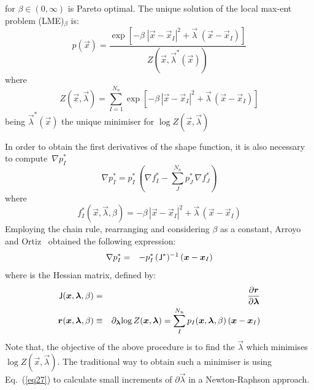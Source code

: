 for $\beta \in (0,\infty)$ is Pareto optimal. The unique solution of
the local max-ent problem (LME)$_\beta$ is: 
\begin{equation}
  \label{eq:LME-p}
p(\vec{x})=\frac{\exp\left[ -\beta \; |\vec{x}-\vec{x}_I|^2 +  \vec{\lambda}  \;  (\vec{x}-\vec{x}_I)         \right] } {Z(\vec{x},\vec{\lambda}^*(\vec{x}))}
\end{equation}
where
\begin{equation}
  \label{eq:LME-Z}
Z(\vec{x}, {\vec{\lambda}}) = \sum_{I=1}^{N_n}{ \exp \left[ -\beta \, | \vec{x}-\vec{x}_I|^2 + \vec{\lambda}  \,  (\vec{x}-\vec{x}_I)  \right]}
\end{equation}
being $\vec{\lambda}^*(\vec{x})$ the unique minimiser  for $\log Z(\vec{x}, \vec{\lambda})$

In order to obtain the first derivatives of the shape function, it is  also necessary to compute~$\nabla p^*_I$ 
\begin{equation}
  \label{eq:LME-grad-p}
\nabla p^*_I=p^*_I  \, \left(\nabla f^*_I-\sum_J^{N_n} p^*_J \, \nabla f^*_J\right)
\end{equation}
where
\begin{equation}
  \label{eq:LME-f}
f^*_I(\vec{x},  \vec{\lambda},\beta)=-\beta \, |\vec{x}-\vec{x}_I|^2 + \vec{\lambda}   \,  (\vec{x}-\vec{x}_I)
\end{equation}
Employing the chain rule, rearranging and considering $\beta$ as a constant, Arroyo and Ortiz~\cite{Arroyo2006} obtained the following expression:
\begin{eqnarray}
\nabla p^*_I &=& -p^*_I \,  (\tens{J}^*)^{-1} \,  (\vec{x} - \vec{x}_I) \label{eq26} 
\end{eqnarray}
where  is the Hessian matrix, defined by:
\begin{eqnarray}
\tens{J}(\vec{x},  \vec{\lambda},\beta) &=& \frac{\partial \vec{r}}{\partial  \vec{\lambda}} \label{eq27} \\ 
\vec{r}(\vec{x},\vec{\lambda},\beta) &\equiv& \partial_{\vec{\lambda}}{\log{ Z( \vec{x},\vec{\lambda}})} 
  =\sum_I^{N_n} p_I(\vec{x},\vec{\lambda},\beta) \, (\vec{x} - \vec{x}_I) \label{eq28} 
\end{eqnarray}
Note that, the objective of the above procedure is to find the $\vec{\lambda}$ which minimises  $\log Z(\vec{x}, \vec{\lambda})$. 
The traditional way to obtain such a minimiser  is using Eq.~(\ref{eq27}) to calculate small increments of $\partial\vec{\lambda}$ in a Newton-Raphson approach. 

